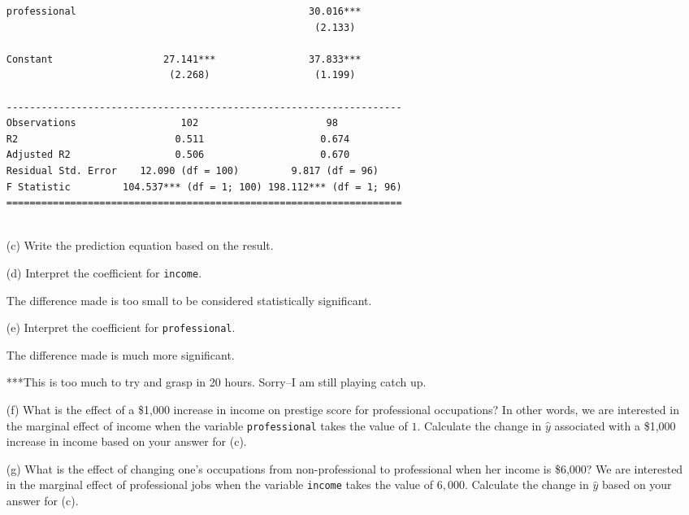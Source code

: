 \documentclass[12pt,letterpaper]{article}
\begin{document}
\begin{enumerate}
\begin{lstlisting}
professional                                        30.016***       
                                                     (2.133)        
                                                                    
Constant                   27.141***                37.833***       
                            (2.268)                  (1.199)        
                                                                    
--------------------------------------------------------------------
Observations                  102                      98           
R2                           0.511                    0.674         
Adjusted R2                  0.506                    0.670         
Residual Std. Error    12.090 (df = 100)         9.817 (df = 96)    
F Statistic         104.537*** (df = 1; 100) 198.112*** (df = 1; 96)
====================================================================
	
	\end{lstlisting}


	\vspace{6cm}
	\item [(c)]
	Write the prediction equation based on the result.
	
\newpage
	\item [(d)]
	Interpret the coefficient for \texttt{income}.
	
	The difference made is too small to be considered statistically significant. 
	
	\vspace{10cm}	
	\item [(e)]
	Interpret the coefficient for \texttt{professional}.
	
	The difference made is much more significant. 
	
	***This is too much to try and grasp in 20 hours. Sorry--I am still playing catch up. 
	
	\newpage
	\item [(f)]
	What is the effect of a \$1,000 increase in income on prestige score for professional occupations? In other words, we are interested in the marginal effect of income when the variable \texttt{professional} takes the value of $1$. Calculate the change in $\hat{y}$ associated with a \$1,000 increase in income based on your answer for (c).
	
	\vspace{10cm}
	
	
	\item [(g)]
	What is the effect of changing one's occupations from non-professional to professional when her income is \$6,000? We are interested in the marginal effect of professional jobs when the variable \texttt{income} takes the value of $6,000$. Calculate the change in $\hat{y}$ based on your answer for (c).
	
	
\end{enumerate}
\end{document}
